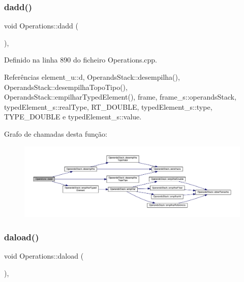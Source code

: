 \subsubsection{\texorpdfstring{dadd()}{dadd()}}
{\footnotesize\ttfamily void Operations\+::dadd (\begin{DoxyParamCaption}{ }\end{DoxyParamCaption})\hspace{0.3cm}{\ttfamily [static]}, {\ttfamily [private]}}



Definido na linha 890 do ficheiro Operations.\+cpp.



Referências element\+\_\+u\+::d, Operands\+Stack\+::desempilha(), Operands\+Stack\+::desempilha\+Topo\+Tipo(), Operands\+Stack\+::empilhar\+Typed\+Element(), frame, frame\+\_\+s\+::operands\+Stack, typed\+Element\+\_\+s\+::real\+Type, R\+T\+\_\+\+D\+O\+U\+B\+LE, typed\+Element\+\_\+s\+::type, T\+Y\+P\+E\+\_\+\+D\+O\+U\+B\+LE e typed\+Element\+\_\+s\+::value.

Grafo de chamadas desta função\+:\nopagebreak
\begin{figure}[H]
\begin{center}
\leavevmode
\includegraphics[width=350pt]{classOperations_a8a23241bed8c033ab75994a18bf2a702_cgraph}
\end{center}
\end{figure}
\mbox{\label{classOperations_a63691de547749780c372e285bd6a97bc}} 
\subsubsection{\texorpdfstring{daload()}{daload()}}
{\footnotesize\ttfamily void Operations\+::daload (\begin{DoxyParamCaption}{ }\end{DoxyParamCaption})\hspace{0.3cm}{\ttfamily [static]}, {\ttfamily [private]}}




